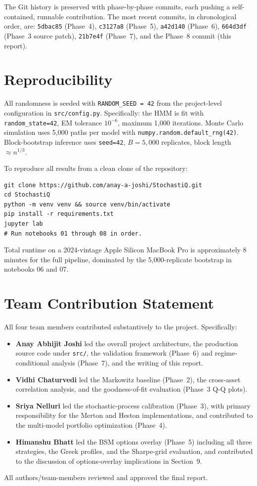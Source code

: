\documentclass[11pt,letterpaper]{article}
\begin{document}
The Git history is preserved with phase-by-phase commits, each pushing a self-contained, runnable contribution. The most recent commits, in chronological order, are: \texttt{5dbac85} (Phase~4), \texttt{c3127a8} (Phase~5), \texttt{a42d140} (Phase~6), \texttt{664d3df} (Phase~3 source patch), \texttt{21b7e4f} (Phase~7), and the Phase~8 commit (this report).

\section{Reproducibility}

All randomness is seeded with \texttt{RANDOM\_SEED = 42} from the project-level configuration in \texttt{src/config.py}. Specifically: the HMM is fit with \texttt{random\_state=42}, EM tolerance $10^{-6}$, maximum 1{,}000 iterations. Monte Carlo simulation uses 5{,}000 paths per model with \texttt{numpy.random.default\_rng(42)}. Block-bootstrap inference uses \texttt{seed=42}, $B = 5{,}000$ replicates, block length $\approx n^{1/3}$.

To reproduce all results from a clean clone of the repository:
\begin{lstlisting}[basicstyle=\small\ttfamily]
git clone https://github.com/anay-a-joshi/StochastiQ.git
cd StochastiQ
python -m venv venv && source venv/bin/activate
pip install -r requirements.txt
jupyter lab
# Run notebooks 01 through 08 in order.
\end{lstlisting}

Total runtime on a 2024-vintage Apple Silicon MacBook Pro is approximately 8 minutes for the full pipeline, dominated by the 5{,}000-replicate bootstrap in notebooks 06 and 07.

\section{Team Contribution Statement}

All four team members contributed substantively to the project. Specifically:

\begin{itemize}[leftmargin=*]
\item \textbf{Anay Abhijit Joshi} led the overall project architecture, the production source code under \texttt{src/}, the validation framework (Phase~6) and regime-conditional analysis (Phase~7), and the writing of this report.
\item \textbf{Vidhi Chaturvedi} led the Markowitz baseline (Phase~2), the cross-asset correlation analysis, and the goodness-of-fit evaluation (Phase~3 Q-Q plots).
\item \textbf{Sriya Nelluri} led the stochastic-process calibration (Phase~3), with primary responsibility for the Merton and Heston implementations, and contributed to the multi-model portfolio optimization (Phase~4).
\item \textbf{Himanshu Bhatt} led the BSM options overlay (Phase~5) including all three strategies, the Greek profiles, and the Sharpe-grid evaluation, and contributed to the discussion of options-overlay implications in Section~9.
\end{itemize}

All authors/team-members reviewed and approved the final report.
\end{document}
